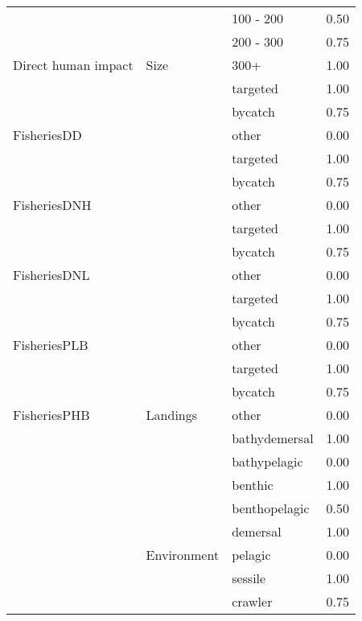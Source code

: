 \documentclass[
  12pt,
]{article}
\begin{document}
\begin{longtable}{llll}
\cmidrule{3-4}
 &  & 100 - 200 & 0.50\\
\cmidrule{3-4}
 &  & 200 - 300 & 0.75\\
\cmidrule{3-4}
\multirow{-9}{*}{\raggedright\arraybackslash Direct human impact} & \multirow{-4}{*}{\raggedright\arraybackslash Size} & 300+ & 1.00\\
\cmidrule{1-4}
 &  & targeted & 1.00\\
\cmidrule{3-4}
 &  & bycatch & 0.75\\
\cmidrule{3-4}
\multirow{-3}{*}{\raggedright\arraybackslash FisheriesDD} &  & other & 0.00\\
\cmidrule{1-1}
\cmidrule{3-4}
 &  & targeted & 1.00\\
\cmidrule{3-4}
 &  & bycatch & 0.75\\
\cmidrule{3-4}
\multirow{-3}{*}{\raggedright\arraybackslash FisheriesDNH} &  & other & 0.00\\
\cmidrule{1-1}
\cmidrule{3-4}
 &  & targeted & 1.00\\
\cmidrule{3-4}
 &  & bycatch & 0.75\\
\cmidrule{3-4}
\multirow{-3}{*}{\raggedright\arraybackslash FisheriesDNL} &  & other & 0.00\\
\cmidrule{1-1}
\cmidrule{3-4}
 &  & targeted & 1.00\\
\cmidrule{3-4}
 &  & bycatch & 0.75\\
\cmidrule{3-4}
\multirow{-3}{*}{\raggedright\arraybackslash FisheriesPLB} &  & other & 0.00\\
\cmidrule{1-1}
\cmidrule{3-4}
 &  & targeted & 1.00\\
\cmidrule{3-4}
 &  & bycatch & 0.75\\
\cmidrule{3-4}
\multirow{-3}{*}{\raggedright\arraybackslash FisheriesPHB} & \multirow{-15}{*}{\raggedright\arraybackslash Landings} & other & 0.00\\
\cmidrule{1-4}
 &  & bathydemersal & 1.00\\
\cmidrule{3-4}
 &  & bathypelagic & 0.00\\
\cmidrule{3-4}
 &  & benthic & 1.00\\
\cmidrule{3-4}
 &  & benthopelagic & 0.50\\
\cmidrule{3-4}
 &  & demersal & 1.00\\
\cmidrule{3-4}
 & \multirow{-6}{*}{\raggedright\arraybackslash Environment} & pelagic & 0.00\\
\cmidrule{2-4}
 &  & sessile & 1.00\\
\cmidrule{3-4}
 &  & crawler & 0.75\\

\end{longtable}
\end{document}

